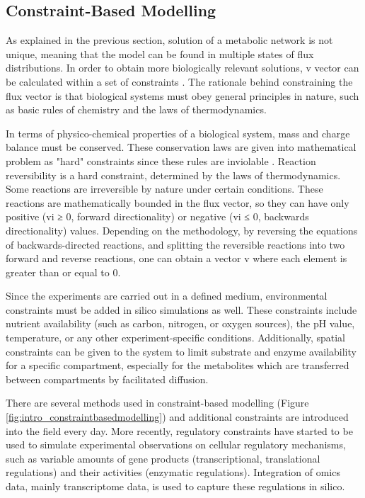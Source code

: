 \subsection{Constraint-Based Modelling}
As explained in the previous section, solution of a metabolic network is not unique, meaning that the model can be found in multiple states of flux distributions. In order to obtain more biologically relevant solutions, v vector can be calculated within a set of constraints \cite{thiele2007bringing}. The rationale behind constraining the flux vector is that biological systems must obey general principles in nature, such as basic rules of chemistry and the laws of thermodynamics.

In terms of physico-chemical properties of a biological system, mass and charge balance must be conserved. These conservation laws are given into mathematical problem as "hard" constraints since these rules are inviolable \cite{price2004genome}. Reaction reversibility is a hard constraint, determined by the laws of thermodynamics. Some reactions are irreversible by nature under certain conditions. These reactions are mathematically bounded in the flux vector, so they can have only positive (vi ≥ 0, forward directionality) or negative (vi ≤ 0, backwards directionality) values. Depending on the methodology, by reversing the equations of backwards-directed reactions, and splitting the reversible reactions into two forward and reverse reactions, one can obtain a vector v where each element is greater than or equal to 0.

Since the experiments are carried out in a defined medium, environmental constraints must be added in silico simulations as well. These constraints include nutrient availability (such as carbon, nitrogen, or oxygen sources), the pH value, temperature, or any other experiment-specific conditions. Additionally, spatial constraints can be given to the system to limit substrate and enzyme availability for a specific compartment, especially for the metabolites which are transferred between compartments by facilitated diffusion.


There are several methods used in constraint-based modelling (Figure \ref{fig:intro_constraintbasedmodelling}) and additional constraints are introduced into the field every day. More recently, regulatory constraints have started to be used to simulate experimental observations on cellular regulatory mechanisms, such as variable amounts of gene products (transcriptional, translational regulations) and their activities (enzymatic regulations). Integration of omics data, mainly transcriptome data, is used to capture these regulations in silico.


